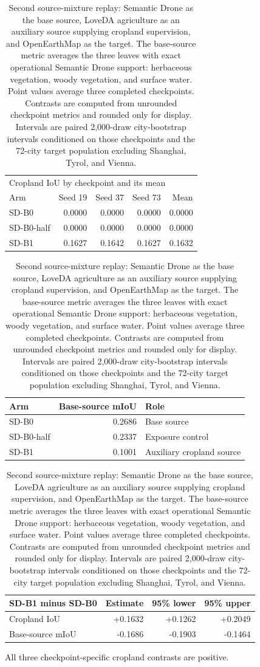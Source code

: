 \begin{table}[H]
\centering
\caption{Second source-mixture replay: Semantic Drone as the base source, LoveDA agriculture as an auxiliary source supplying cropland supervision, and OpenEarthMap as the target. The base-source metric averages the three leaves with exact operational Semantic Drone support: herbaceous vegetation, woody vegetation, and surface water. Point values average three completed checkpoints. Contrasts are computed from unrounded checkpoint metrics and rounded only for display. Intervals are paired 2,000-draw city-bootstrap intervals conditioned on those checkpoints and the 72-city target population excluding Shanghai, Tyrol, and Vienna.}
\label{tab:second-mixture}
\small
\renewcommand{\arraystretch}{1.12}
\setlength{\tabcolsep}{4pt}
\begin{tabular*}{\linewidth}{@{\extracolsep{\fill}}lrrrr@{}}
\toprule
\multicolumn{5}{l}{Cropland IoU by checkpoint and its mean} \\
Arm & Seed 19 & Seed 37 & Seed 73 & Mean \\
\midrule
SD-B0 & 0.0000 & 0.0000 & 0.0000 & 0.0000 \\
SD-B0-half & 0.0000 & 0.0000 & 0.0000 & 0.0000 \\
SD-B1 & 0.1627 & 0.1642 & 0.1627 & 0.1632 \\
\bottomrule
\end{tabular*}
\par\medskip
\begin{tabular*}{\linewidth}{@{\extracolsep{\fill}}lrl@{}}
\toprule
Arm & Base-source mIoU & Role \\
\midrule
SD-B0 & 0.2686 & Base source \\
SD-B0-half & 0.2337 & Exposure control \\
SD-B1 & 0.1001 & Auxiliary cropland source \\
\bottomrule
\end{tabular*}
\par\medskip
\begin{tabular*}{\linewidth}{@{\extracolsep{\fill}}lrrr@{}}
\toprule
SD-B1 minus SD-B0 & Estimate & 95\% lower & 95\% upper \\
\midrule
Cropland IoU & +0.1632 & +0.1262 & +0.2049 \\
Base-source mIoU & -0.1686 & -0.1903 & -0.1464 \\
\bottomrule
\end{tabular*}
\par\smallskip
\raggedright All three checkpoint-specific cropland contrasts are positive.
\end{table}

